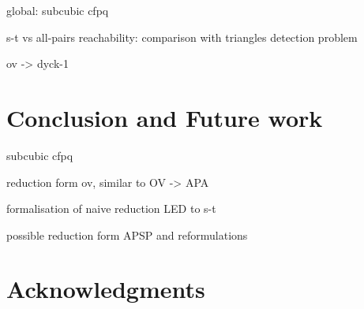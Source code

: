 \documentclass[acmsmall,review,nonacm]{acmart}\settopmatter{printfolios=true,printccs=false,printacmref=false}
\begin{document}
	global: subcubic cfpq
	
	s-t vs all-pairs reachability: comparison with triangles detection problem
	
	ov -> dyck-1
	
	\section{Conclusion and Future work}
	
	subcubic cfpq
	
	reduction form ov, similar to OV -> APA
	
	formalisation of naive reduction LED to s-t
	
	possible reduction form APSP and reformulations
	
	\section{Acknowledgments}
	
	
	
	
	\appendix
	
\end{document}
